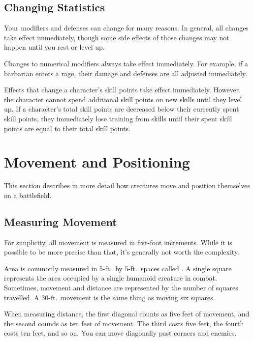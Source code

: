     \subsection{Changing Statistics}

        Your modifiers and defenses can change for many reasons.
        In general, all changes take effect immediately, though some side effects of those changes may not happen until you rest or level up.

         Changes to numerical modifiers always take effect immediately.
        For example, if a barbarian enters a rage, their damage and defenses are all adjusted immediately.

         Effects that change a character's skill points take effect immediately.
        However, the character cannot spend additional skill points on new skills until they level up.
        If a character's total skill points are decreased below their currently spent skill points, they immediately lose training from skills until their spent skill points are equal to their total skill points.

\section{Movement and Positioning}\label{Movement and Positioning}

    This section describes in more detail how creatures move and position themselves on a battlefield.

    \subsection{Measuring Movement}

        For simplicity, all movement is measured in five-foot increments.
        While it is possible to be more precise than that, it's generally not worth the complexity.

        \label{Squares} Area is commonly measured in 5-ft.\ by 5-ft.\ spaces called .
        A single square represents the area occupied by a single humanoid creature in combat.
        Sometimes, movement and distance are represented by the number of squares travelled.
        A 30-ft.\ movement is the same thing as moving six squares.

        \label{Diagonals} When measuring distance, the first diagonal counts as five feet of movement, and the second counds as ten feet of movement.
        The third costs five feet, the fourth costs ten feet, and so on.
        You can move diagonally past corners and enemies.

